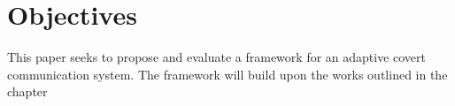 \chapter{Objectives}
\label{ch:objectives}

This paper seeks to propose and evaluate a framework for an adaptive covert communication system. The framework will build upon the works outlined in the  chapter